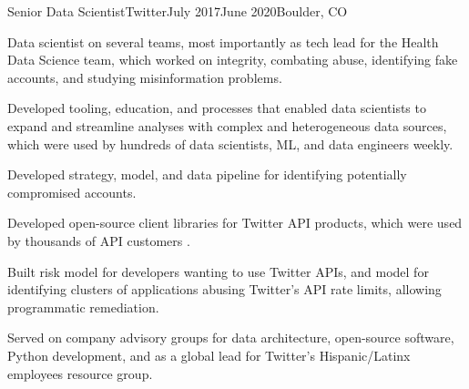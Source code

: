 \documentclass[print]{friggeri-cv} %
\begin{document}
\begin{job}
  {}{Senior Data Scientist}{Twitter}{July 2017}{June 2020}{Boulder, CO}{
    Data scientist on several teams, most importantly as tech lead for the Health Data Science team,
    which worked on integrity, combating abuse, identifying fake accounts, and studying misinformation problems.
    

    \begin{myitemize}
      \item Developed tooling, education, and processes that enabled data scientists to expand and streamline analyses 
      with complex and heterogeneous data sources, which were used by hundreds of data scientists, ML, and data
      engineers weekly.

      \item Developed strategy, model, and data pipeline for identifying potentially compromised accounts.

      \item Developed open-source client libraries for Twitter API products,
      which were used by thousands of API customers
      \autocite{search_tweets_python,do_more_with_twitter_data}.

      \item Built risk model for developers wanting to use Twitter APIs, and model for identifying clusters of
      applications abusing Twitter's API rate limits, allowing programmatic remediation.

      \item Served on company advisory groups for data architecture, open-source software, Python development,
      and as a global lead for Twitter's Hispanic/Latinx employees resource group.

    \end{myitemize}
  }
\end{job}
\end{document}
